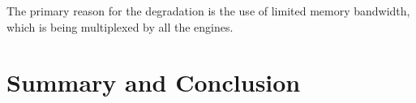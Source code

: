 \documentclass[a4paper,11pt, final]{report}
\begin{document}
The primary reason for the degradation is the use of limited memory bandwidth, which is being multiplexed by all the engines.

\chapter{Summary and Conclusion}










\end{document}
